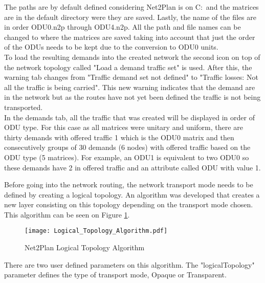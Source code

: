 \documentclass[12pt, a4paper]{article}
\begin{document}
	The paths are by default defined considering Net2Plan is on C:\ and the matrices are in the default directory were they are saved. Lastly, the name of the files are in order ODU0.n2p through ODU4.n2p. All the path and file names can be changed to where the matrices are saved taking into account that just the order of the ODUs needs to be kept due to the conversion to ODU0 units.\\
	
	To load the resulting demands into the created network the second icon on top of the network topology called "Load a demand traffic set" is used. After this, the warning tab changes from "Traffic demand set not defined" to "Traffic losses: Not all the traffic is being carried". This new warning indicates that the demand are in the network but as the routes have not yet been defined the traffic is not being transported.\\
	
	In the demands tab, all the traffic that was created will be displayed in order of ODU type. For this case as all matrices were unitary and uniform, there are thirty demands with offered traffic 1 which is the ODU0 matrix and then consecutively groups of 30 demands (6 nodes) with offered traffic based on the ODU type (5 matrices). For example, an ODU1 is equivalent to two ODU0 so these demands have 2 in offered traffic and an attribute called ODU with value 1.\\
	
	\pagebreak
	
	Before going into the network routing, the network transport mode needs to be defined by creating a logical topology. An algorithm was developed that creates a new layer consisting on this topology depending on the transport mode chosen. This algorithm can be seen on Figure \ref{Logical_Topology_Algorithm}.\\
	
	
	\begin{figure}[h!]
		\centering
		\texttt{[image: Logical\_Topology\_Algorithm.pdf]}
		\caption{Net2Plan Logical Topology Algorithm}
		\label{Logical_Topology_Algorithm}
	\end{figure}	
	
	There are two user defined parameters on this algorithm. The "logicalTopology" parameter defines the type of transport mode, Opaque or Transparent.\\
	
	
\end{document}
